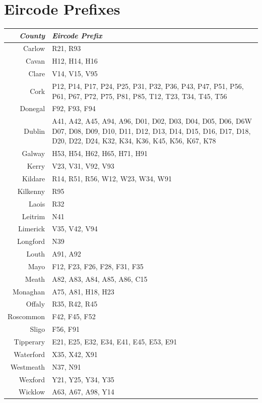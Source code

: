 \documentclass[twocolumn]{article}
\begin{document}


\raggedright

\appendix
\section{Eircode Prefixes\label{a:eircode}}
\begin{tabularx}{0.5\textwidth}{r X}
    \textit{County} & \textit{Eircode Prefix} \\ \hline
    Carlow & R21, R93 \\ \hline
    Cavan & H12, H14, H16 \\ \hline
    Clare & V14, V15, V95 \\ \hline
    Cork & P12, P14, P17, P24, P25, P31, P32, P36, P43, P47, P51, P56, P61, P67, P72, P75, P81, P85, T12, T23, T34, T45, T56 \\ \hline
    Donegal & F92, F93, F94 \\ \hline
    Dublin & A41, A42, A45, A94, A96, D01, D02, D03, D04, D05, D06, D6W D07, D08, D09, D10, D11, D12, D13, D14, D15, D16, D17, D18, D20, D22, D24, K32, K34, K36, K45, K56, K67, K78 \\ \hline
    Galway & H53, H54, H62, H65, H71, H91 \\ \hline
    Kerry & V23, V31, V92, V93 \\ \hline
    Kildare & R14, R51, R56, W12, W23, W34, W91 \\ \hline
    Kilkenny & R95 \\ \hline
    Laois & R32 \\ \hline
    Leitrim & N41 \\ \hline
    Limerick & V35, V42, V94 \\ \hline
    Longford & N39 \\ \hline
    Louth & A91, A92 \\ \hline
    Mayo & F12, F23, F26, F28, F31, F35 \\ \hline
    Meath & A82, A83, A84, A85, A86, C15 \\ \hline
    Monaghan & A75, A81, H18, H23 \\ \hline
    Offaly & R35, R42, R45 \\ \hline
    Roscommon & F42, F45, F52 \\ \hline
    Sligo & F56, F91 \\ \hline
    Tipperary & E21, E25, E32, E34, E41, E45, E53, E91 \\ \hline
    Waterford & X35, X42, X91 \\ \hline
    Westmeath & N37, N91 \\ \hline
    Wexford & Y21, Y25, Y34, Y35 \\ \hline
    Wicklow & A63, A67, A98, Y14
\end{tabularx}
\end{document}

